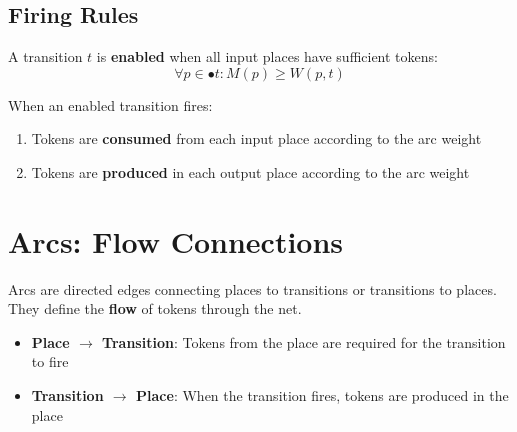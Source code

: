 \subsection{Firing Rules}

A transition $t$ is \textbf{enabled} when all input places have sufficient tokens:
\[
\forall p \in \bullet t: M(p) \geq W(p, t)
\]

When an enabled transition fires:
\begin{enumerate}
    \item Tokens are \textbf{consumed} from each input place according to the arc weight
    \item Tokens are \textbf{produced} in each output place according to the arc weight
\end{enumerate}

\section{Arcs: Flow Connections}
\label{sec:arcs}

Arcs are directed edges connecting places to transitions or transitions to places. They define the \textbf{flow} of tokens through the net.

\begin{itemize}
    \item \textbf{Place $\rightarrow$ Transition}: Tokens from the place are required for the transition to fire
    \item \textbf{Transition $\rightarrow$ Place}: When the transition fires, tokens are produced in the place
\end{itemize}

